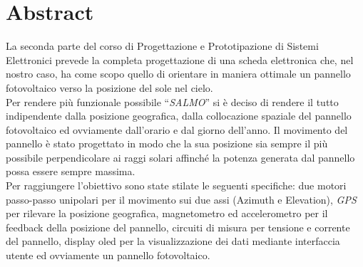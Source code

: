 \chapter{Abstract}

La seconda parte del corso di Progettazione e Prototipazione di Sistemi
Elettronici prevede la completa progettazione di una scheda elettronica
che, nel nostro caso, ha come scopo quello di orientare in maniera
ottimale un pannello fotovoltaico verso la posizione del sole nel
cielo.\\
Per rendere più funzionale possibile ``\emph{SALMO}'' si è deciso di
rendere il tutto indipendente dalla posizione geografica, dalla
collocazione spaziale del pannello fotovoltaico ed ovviamente
dall'orario e dal giorno dell'anno. Il movimento del pannello è stato
progettato in modo che la sua posizione sia sempre il più possibile
perpendicolare ai raggi solari affinché la potenza generata dal pannello
possa essere sempre massima.\\
Per raggiungere l'obiettivo sono state stilate le seguenti specifiche:
due motori passo-passo unipolari per il movimento sui due assi (Azimuth
e Elevation), \emph{GPS} per rilevare la posizione geografica,
magnetometro ed accelerometro per il feedback della posizione del
pannello, circuiti di misura per tensione e corrente del pannello,
display oled per la visualizzazione dei dati mediante interfaccia utente
ed ovviamente un pannello fotovoltaico.

